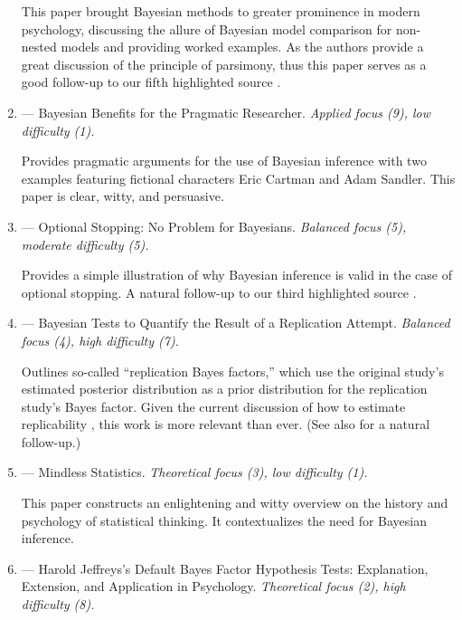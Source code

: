 \begin{enumerate}
This paper brought Bayesian methods to greater prominence in modern psychology, discussing the allure of Bayesian model comparison for non-nested models and providing worked examples. As the authors provide a great discussion of the principle of parsimony, thus this paper serves as a good follow-up to our fifth highlighted source \cite{vandekerckhove2015model}.

\item \textbf{} --- Bayesian Benefits for the Pragmatic Researcher. \emph{Applied focus (9), low difficulty (1).}

Provides pragmatic arguments for the use of Bayesian inference with two examples featuring fictional characters Eric Cartman and Adam Sandler. This paper is clear, witty, and persuasive.

\item
\textbf{} --- Optional Stopping: No Problem for Bayesians. \emph{Balanced focus (5), moderate difficulty (5).}

Provides a simple illustration of why Bayesian inference is valid in the case of optional stopping. A natural follow-up to our third highlighted source \cite{Dienes2011}.

\item  
\textbf{} --- Bayesian Tests to Quantify the Result of a Replication Attempt. \emph{Balanced focus (4), high difficulty (7).}

Outlines so-called ``replication Bayes factors,'' which use the original study's estimated posterior distribution as a prior distribution for the replication study's Bayes factor. Given the current discussion of how to estimate replicability \cite{open2015estimating}, this work is more relevant than ever. (See also  for a natural follow-up.)

\item
\textbf{} --- Mindless Statistics. \emph{Theoretical focus (3), low difficulty (1).}

This paper constructs an enlightening and witty overview on the history and psychology of statistical thinking. It contextualizes the need for Bayesian inference.

\item
\textbf{} --- Harold Jeffreys's Default Bayes Factor Hypothesis Tests: Explanation, Extension, and Application in Psychology. \emph{Theoretical focus (2), high difficulty (8).}


\end{enumerate}
